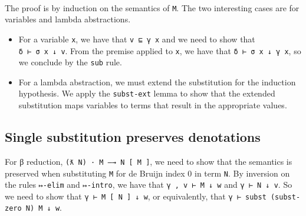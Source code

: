 \begin{fence}
\begin{code}
\>[0][@{}l@{\AgdaIndent{0}}]%
\>[2]\AgdaSpace{}%
\AgdaSymbol{(}\AgdaSpace{}%
\AgdaSpace{}%
\AgdaSpace{}%
\AgdaSymbol{)}\AgdaSpace{}%
\AgdaSymbol{(}\AgdaSpace{}%
\AgdaSpace{}%
\AgdaSpace{}%
\AgdaSymbol{)}\<%
\\
\>[0]\AgdaSpace{}%
\AgdaSpace{}%
\AgdaSpace{}%
\AgdaSymbol{(}\AgdaSpace{}%
\AgdaSpace{}%
\AgdaSymbol{)}\AgdaSpace{}%
\AgdaSymbol{=}\AgdaSpace{}%
\AgdaSpace{}%
\AgdaSymbol{(}\AgdaSpace{}%
\AgdaSpace{}%
\AgdaSpace{}%
\AgdaSymbol{)}\AgdaSpace{}%
\<%
\end{code}
\end{fence}

The proof is by induction on the semantics of \texttt{M}. The two
interesting cases are for variables and lambda abstractions.

\begin{itemize}
\item
  For a variable \texttt{x}, we have that \texttt{v\ ⊑\ γ\ x} and we
  need to show that \texttt{δ\ ⊢\ σ\ x\ ↓\ v}. From the premise applied
  to \texttt{x}, we have that \texttt{δ\ ⊢\ σ\ x\ ↓\ γ\ x}, so we
  conclude by the \texttt{sub} rule.
\item
  For a lambda abstraction, we must extend the substitution for the
  induction hypothesis. We apply the \texttt{subst-ext} lemma to show
  that the extended substitution maps variables to terms that result in
  the appropriate values.
\end{itemize}

\hypertarget{single-substitution-preserves-denotations}{%
\subsection{Single substitution preserves
denotations}\label{single-substitution-preserves-denotations}}

For β reduction, \texttt{(ƛ\ N)\ ·\ M\ —→\ N\ {[}\ M\ {]}}, we need to
show that the semantics is preserved when substituting \texttt{M} for de
Bruijn index 0 in term \texttt{N}. By inversion on the rules
\texttt{↦-elim} and \texttt{↦-intro}, we have that
\texttt{γ\ ,\ v\ ⊢\ M\ ↓\ w} and \texttt{γ\ ⊢\ N\ ↓\ v}. So we need to
show that \texttt{γ\ ⊢\ M\ {[}\ N\ {]}\ ↓\ w}, or equivalently, that
\texttt{γ\ ⊢\ subst\ (subst-zero\ N)\ M\ ↓\ w}.

